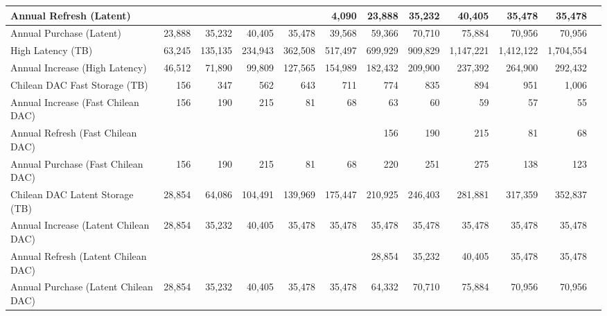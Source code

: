 \begin{longtable} { |p{}  |r  |r  |r  |r  |r  |r  |r  |r  |r  |r  |r |}
{Annual Refresh (Latent)}&{}&{}&{}&{}&{4,090}&{23,888}&{35,232}&{40,405}&{35,478}&{35,478} \\ \hline
{Annual Purchase (Latent)}&{23,888}&{35,232}&{40,405}&{35,478}&{39,568}&{59,366}&{70,710}&{75,884}&{70,956}&{70,956} \\ \hline
{High Latency (TB)}&{63,245}&{135,135}&{234,943}&{362,508}&{517,497}&{699,929}&{909,829}&{1,147,221}&{1,412,122}&{1,704,554} \\ \hline
{Annual Increase (High Latency)}&{46,512}&{71,890}&{99,809}&{127,565}&{154,989}&{182,432}&{209,900}&{237,392}&{264,900}&{292,432} \\ \hline
{Chilean DAC Fast Storage (TB)}&{156}&{347}&{562}&{643}&{711}&{774}&{835}&{894}&{951}&{1,006} \\ \hline
{Annual Increase (Fast Chilean DAC)}&{156}&{190}&{215}&{81}&{68}&{63}&{60}&{59}&{57}&{55} \\ \hline
{Annual Refresh (Fast Chilean DAC)}&{}&{}&{}&{}&{}&{156}&{190}&{215}&{81}&{68} \\ \hline
{Annual Purchase (Fast Chilean DAC)}&{156}&{190}&{215}&{81}&{68}&{220}&{251}&{275}&{138}&{123} \\ \hline
{Chilean DAC Latent Storage (TB)}&{28,854}&{64,086}&{104,491}&{139,969}&{175,447}&{210,925}&{246,403}&{281,881}&{317,359}&{352,837} \\ \hline
{Annual Increase (Latent Chilean DAC)}&{28,854}&{35,232}&{40,405}&{35,478}&{35,478}&{35,478}&{35,478}&{35,478}&{35,478}&{35,478} \\ \hline
{Annual Refresh (Latent Chilean DAC)}&{}&{}&{}&{}&{}&{28,854}&{35,232}&{40,405}&{35,478}&{35,478} \\ \hline
{Annual Purchase (Latent Chilean DAC)}&{28,854}&{35,232}&{40,405}&{35,478}&{35,478}&{64,332}&{70,710}&{75,884}&{70,956}&{70,956} \\ \hline
\end{longtable} \normalsize
